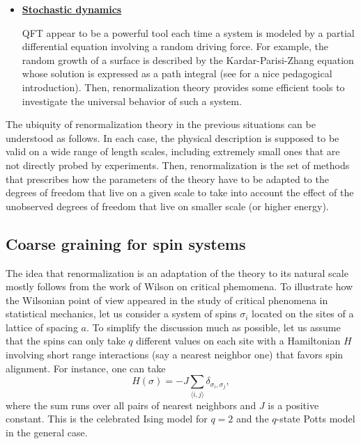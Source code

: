 \documentclass[10pt,here,feynmf]{article}
\begin{document}
\begin{itemize}
\item
\underline{\bf Stochastic dynamics}

QFT appear to be a powerful tool each time a system is modeled by a partial differential equation involving a random driving force. For example, the random growth of a surface is described by the Kardar-Parisi-Zhang equation whose solution is expressed as a path integral (see \cite{zee} for a nice pedagogical introduction). Then, renormalization theory provides some efficient tools to investigate the universal behavior of such a system.

\end{itemize}

The ubiquity of renormalization theory  in the previous situations can be understood as follows. In each case, the physical description is supposed to be valid on a wide range of length scales, including extremely small ones that are not directly probed by experiments. Then, renormalization is the set of methods that prescribes how the parameters of the theory have to be adapted to the degrees of freedom that live on a given scale to take into account the effect of the unobserved degrees of freedom that live on smaller scale (or higher energy).  


\subsection{Coarse graining for spin systems}

The idea that renormalization is an adaptation of the theory to its natural scale mostly follows from the work of Wilson on critical phemomena. To illustrate how the Wilsonian point of view appeared in the study of critical phenomena in statistical mechanics, let us consider a system of spins ${\sigma_{i}}$  located on the sites of a lattice of spacing $a$. To simplify the discussion much as possible, let us assume that the spins can only take  $q$ different values on each site with a Hamiltonian $H$ involving short range interactions (say a nearest   neighbor one) that favors spin alignment. For instance, one can take
\begin{equation}
H(\sigma)=-J\sum_{\langle i,j\rangle}\delta_{\sigma_{i},\sigma_{j}},
\end{equation}
where the sum runs over all pairs of nearest  neighbors and $J$ is a positive constant. This is the celebrated Ising model for $q=2$ and the $q$-state Potts model in the general case.
\end{document}
